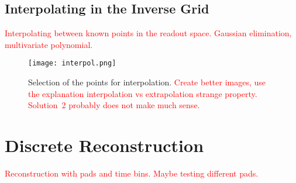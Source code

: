 		\subsection{Interpolating in the Inverse Grid}
			\textcolor{red}{Interpolating between known points in the readout space. Gaussian elimination, multivariate polynomial.}
			
			\begin{figure}
				\centering
				\texttt{[image: interpol.png]}
				\caption{Selection of the points for interpolation. \textcolor{red}{Create better images, use the explanation interpolation vs extrapolation strange property. Solution~2 probably does not make much sense.}}
				\label{fig:interpol}
			\end{figure}
		
	\section{Discrete Reconstruction}
		\textcolor{red}{Reconstruction with pads and time bins. Maybe testing different pads.}